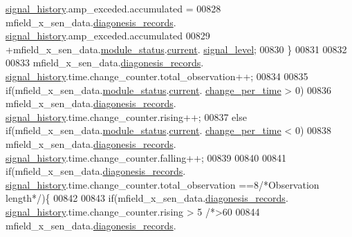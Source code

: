 \begin{DoxyCode}
      \hyperlink{a00019_ab7038f4de1f77b52a7f89e9f77c0b846}{signal\_history}.amp\_exceded.accumulated =
00828                      mfield\_x\_sen\_data.\hyperlink{a00025_a2bd79ce84bbd6b7f50d38954f7ae475e}{diagonesis\_records}.
      \hyperlink{a00019_ab7038f4de1f77b52a7f89e9f77c0b846}{signal\_history}.amp\_exceded.accumulated
00829                      +mfield\_x\_sen\_data.\hyperlink{a00025_adfab5a5d8b45a93dfb13edb24e2b80e3}{module\_status}.\hyperlink{a00019_acf41ffc11da291c2f9f0fcb02ee72b98}{current}.
      \hyperlink{a00019_a4070db8eab0ff93e3fbc1df59872f117}{signal\_level};
00830              \}
00831 
00832 
00833               mfield\_x\_sen\_data.\hyperlink{a00025_a2bd79ce84bbd6b7f50d38954f7ae475e}{diagonesis\_records}.
      \hyperlink{a00019_ab7038f4de1f77b52a7f89e9f77c0b846}{signal\_history}.time.change\_counter.total\_observation++;
00834 
00835              \textcolor{keywordflow}{if}(mfield\_x\_sen\_data.\hyperlink{a00025_adfab5a5d8b45a93dfb13edb24e2b80e3}{module\_status}.\hyperlink{a00019_acf41ffc11da291c2f9f0fcb02ee72b98}{current}.
      \hyperlink{a00019_a0f645dd76b41adc6a966feba8e4bff8c}{change\_per\_time} > 0)
00836                  mfield\_x\_sen\_data.\hyperlink{a00025_a2bd79ce84bbd6b7f50d38954f7ae475e}{diagonesis\_records}.
      \hyperlink{a00019_ab7038f4de1f77b52a7f89e9f77c0b846}{signal\_history}.time.change\_counter.rising++;
00837              \textcolor{keywordflow}{else}  \textcolor{keywordflow}{if}(mfield\_x\_sen\_data.\hyperlink{a00025_adfab5a5d8b45a93dfb13edb24e2b80e3}{module\_status}.\hyperlink{a00019_acf41ffc11da291c2f9f0fcb02ee72b98}{current}.
      \hyperlink{a00019_a0f645dd76b41adc6a966feba8e4bff8c}{change\_per\_time} < 0)
00838              mfield\_x\_sen\_data.\hyperlink{a00025_a2bd79ce84bbd6b7f50d38954f7ae475e}{diagonesis\_records}.
      \hyperlink{a00019_ab7038f4de1f77b52a7f89e9f77c0b846}{signal\_history}.time.change\_counter.falling++;
00839 
00840 
00841              \textcolor{keywordflow}{if}(mfield\_x\_sen\_data.\hyperlink{a00025_a2bd79ce84bbd6b7f50d38954f7ae475e}{diagonesis\_records}.
      \hyperlink{a00019_ab7038f4de1f77b52a7f89e9f77c0b846}{signal\_history}.time.change\_counter.total\_observation ==8\textcolor{comment}{/*Observation length*/})\{
00842 
00843              \textcolor{keywordflow}{if}(mfield\_x\_sen\_data.\hyperlink{a00025_a2bd79ce84bbd6b7f50d38954f7ae475e}{diagonesis\_records}.
      \hyperlink{a00019_ab7038f4de1f77b52a7f89e9f77c0b846}{signal\_history}.time.change\_counter.rising > 5 \textcolor{comment}{/*>60%
00844                   mfield\_x\_sen\_data.\hyperlink{a00025_a2bd79ce84bbd6b7f50d38954f7ae475e}{diagonesis\_records}.
}
\end{DoxyCode}
